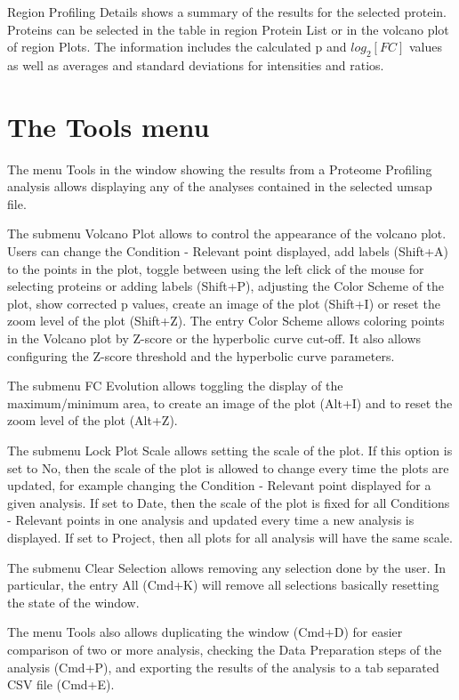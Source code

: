 Region Profiling Details shows a summary of the results for the selected protein.
Proteins can be selected in the table in region Protein List or in the volcano plot
of region Plots. The information includes the calculated p and $log_2[FC]$ values
as well as averages and standard deviations for intensities and ratios.

\section{The Tools menu}
\label{sec:protprofTools}

The menu Tools in the window showing the results from a Proteome Profiling analysis
allows displaying any of the analyses contained in the selected umsap file.

The submenu Volcano Plot allows to control the appearance of the volcano plot. Users
can change the Condition - Relevant point displayed, add labels (Shift+A) to
the points in the plot, toggle between using the left click of the mouse for selecting
proteins or adding labels (Shift+P), adjusting the Color Scheme of the plot, show
corrected p values, create an image of the plot (Shift+I) or reset the zoom level of
the plot (Shift+Z). The entry Color Scheme allows coloring points in the Volcano plot
by Z-score or the hyperbolic curve cut-off. It also allows configuring the Z-score
threshold and the hyperbolic curve parameters.

The submenu FC Evolution allows toggling the display of the maximum/minimum area,
to create an image of the plot (Alt+I) and to reset the zoom level of the plot (Alt+Z).

The submenu Lock Plot Scale allows setting the scale of the plot. If this option
is set to No, then the scale of the plot is allowed to change every time the plots
are updated, for example changing the Condition - Relevant point displayed for a
given analysis. If set to Date, then the scale of the plot is fixed for all Conditions
- Relevant points in one analysis and updated every time a new analysis is displayed.
If set to Project, then all plots for all analysis will have the same scale.

The submenu Clear Selection allows removing any selection done by the user. In
particular, the entry All (Cmd+K) will remove all selections basically resetting
the state of the window.

The menu Tools also allows duplicating the window (Cmd+D) for easier comparison of
two or more analysis, checking the Data Preparation steps of the analysis (Cmd+P),
and exporting the results of the analysis to a tab separated CSV file (Cmd+E).

